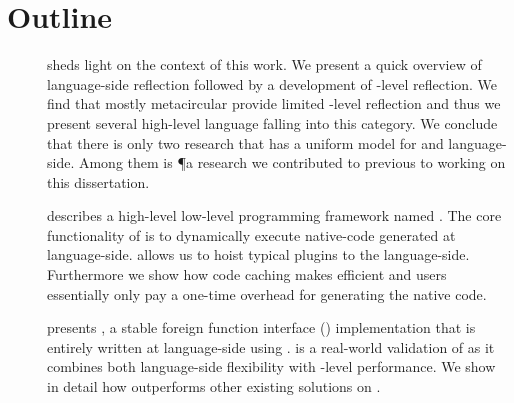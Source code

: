 \section{Outline}

\begin{description}
\item[] sheds light on the context of this work.
	We present a quick overview of language-side reflection followed by a development of \VM-level reflection.
	We find that mostly metacircular \VMs provide limited \VM-level reflection and thus we present several high-level language \VMs falling into this category.
	We conclude that there is only two research \VM that has a uniform model for \VM and language-side.
	Among them is \P a research \ST \VM we contributed to previous to working on this dissertation.


\item[] describes a high-level low-level programming framework named \B.
	The core functionality of \B is to dynamically execute native-code generated at language-side.
	\B allows us to hoist typical \VM plugins to the language-side.
	Furthermore we show how code caching makes \B efficient and users essentially only pay a one-time overhead for generating the native code.
	
\item[] presents \NB, a stable foreign function interface (\FFI) implementation that is entirely written at language-side using \B.
	\NB is a real-world validation of \B as it combines both language-side flexibility with \VM-level performance.
	We show in detail how \NB outperforms other existing \FFI solutions on \PH.


\end{description}
